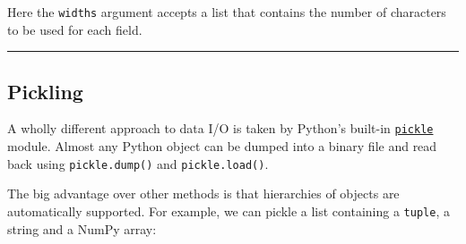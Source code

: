 \documentclass[10pt]{scrartcl}
\begin{document}
    Here the \texttt{widths} argument accepts a list that contains the
number of characters to be used for each field.

    \begin{center}\rule{0.5\linewidth}{0.5pt}\end{center}

\hypertarget{pickling}{%
\subsection{Pickling}\label{pickling}}

A wholly different approach to data I/O is taken by Python's built-in
\href{https://docs.python.org/3/library/pickle.html}{\texttt{pickle}}
module. Almost any Python object can be dumped into a binary file and
read back using \texttt{pickle.dump()} and \texttt{pickle.load()}.

The big advantage over other methods is that hierarchies of objects are
automatically supported. For example, we can pickle a list containing a
\texttt{tuple}, a string and a NumPy array:
\end{document}
